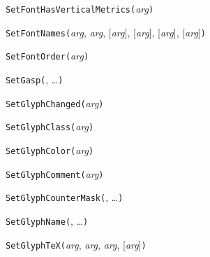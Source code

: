 
\texttt{SetFontHasVerticalMetrics(}\textit{arg}\texttt{)}



\texttt{SetFontNames(}\textit{arg}, \textit{arg}, [\textit{arg}], [\textit{arg}], [\textit{arg}], [\textit{arg}]\texttt{)}



\texttt{SetFontOrder(}\textit{arg}\texttt{)}



\texttt{SetGasp(}, \ldots\texttt{)}



\texttt{SetGlyphChanged(}\textit{arg}\texttt{)}



\texttt{SetGlyphClass(}\textit{arg}\texttt{)}



\texttt{SetGlyphColor(}\textit{arg}\texttt{)}



\texttt{SetGlyphComment(}\textit{arg}\texttt{)}



\texttt{SetGlyphCounterMask(}, \ldots\texttt{)}



\texttt{SetGlyphName(}, \ldots\texttt{)}



\texttt{SetGlyphTeX(}\textit{arg}, \textit{arg}, \textit{arg}, [\textit{arg}]\texttt{)}

